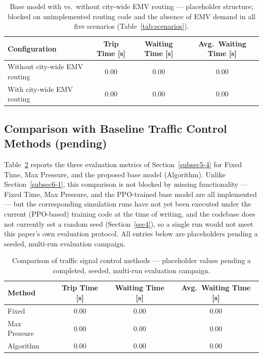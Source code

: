 \documentclass[3p,times]{elsarticle}
\theoremstyle{plain}
\theoremstyle{definition}
\begin{document}
\begin{table}[t]
\centering
\caption{Base model with vs.\ without city-wide EMV routing --- placeholder structure; blocked on unimplemented routing code and the absence of EMV demand in all five scenarios (Table~\ref{tab:scenarios}).}
\label{tab:emv-routing}
\small
\begin{tabular}{lccc}
\toprule
Configuration & Trip Time [s] & Waiting Time [s] & Avg.\ Waiting Time [s] \\
\midrule
Without city-wide EMV routing & 0.00 & 0.00 & 0.00 \\
With city-wide EMV routing    & 0.00 & 0.00 & 0.00 \\
\bottomrule
\end{tabular}
\end{table}

\subsection{Comparison with Baseline Traffic Control Methods (pending)}\label{subsec6-2}

Table~\ref{tab:baseline-comparison} reports the three evaluation
metrics of Section~\ref{subsec5-4} for Fixed Time, Max Pressure, and
the proposed base model (Algorithm). Unlike
Section~\ref{subsec6-1}, this comparison is not blocked by missing
functionality --- Fixed Time, Max Pressure, and the PPO-trained base
model are all implemented --- but the corresponding simulation runs
have not yet been executed under the current (PPO-based) training code
at the time of writing, and the codebase does not currently set a
random seed (Section~\ref{sec4}), so a single run would not meet this
paper's own evaluation protocol. All entries below are placeholders
pending a seeded, multi-run evaluation campaign.

\begin{table}[t]
\centering
\caption{Comparison of traffic signal control methods --- placeholder values pending a completed, seeded, multi-run evaluation campaign.}
\label{tab:baseline-comparison}
\small
\begin{tabular}{lccc}
\toprule
Method & Trip Time [s] & Waiting Time [s] & Avg.\ Waiting Time [s] \\
\midrule
Fixed       & 0.00 & 0.00 & 0.00 \\
Max Pressure & 0.00 & 0.00 & 0.00 \\
Algorithm   & 0.00 & 0.00 & 0.00 \\
\bottomrule
\end{tabular}
\end{table}
\end{document}
